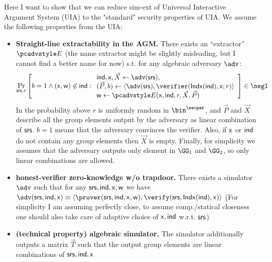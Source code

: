 \documentclass[runningheads,11pt]{llncs}
\let\spvec\vec \let\vec\accentvec
\let\vec\spvec
\begin{document}
Here I want to show that we can reduce sim-ext of Universal Interactive Argument System
(UIA) to the "standard" security properties of UIA.
We assume the following properties from the UIA:
\begin{itemize}
	\item {\bf Straight-line extractability in the AGM.}
		There exists an ``extractor'' $\Ext$ (the name extractor might be slightly misleading, but I
		cannot find a better name for now) s.t. for any algebraic adversary $\adv$:
		\[
			\Prob[\srs,r]{
					b=1 \wedge (\inp,\wit)\not\in\ind:
					\begin{array}{l}
					\ind,\inp, \vec X \gets\adv(\srs),\\
					(\vec P,b) \gets \braket{\adv(\srs),\verifier(\Iphp(\ind),\inp;r)}\\
					\wit \gets \Ext(\inp,\ind,r,\vec X,\vec P)
					\end{array}
					}\in\negl
		\]
		In the probability above $r$ is uniformly random in $\bin^\secpar$, and $\vec P$ and
		$\vec X$	describe all the group elements output by the adversary as linear combination of
		$\mathsf{srs}$. $b=1$ means that the adversary convinces the verifier. Also, if $\mathsf{x}$ or ${\mathsf{ind}}$
		do not contain any group elements then $\vec X$ is	empty. Finally, for simplicity we assumes that the adversary outputs only element in
		$\GG_1$ and $\GG_2$, so only linear combinations are allowed.
	\item {\bf honest-verifier zero-knowledge w/o trapdoor.}
		There exists a simulator $\sdv$ such that for any $\mathsf{srs},{\mathsf{ind}},\mathsf{x},\mathsf{w}$ we have
		$\sdv(\srs,\ind,\inp)\equiv
		\braket{\prover(\srs,\ind,\inp,\wit),\verify(\srs,\Iphp(\ind),\inp)}$
		(For simplicity I am assuming perfectly close, to assume comp./statical closeness one should also
		take care of adaptive choice of $\mathsf{x},{\mathsf{ind}}$ w.r.t. $\mathsf{srs}$)

	\item {\bf (technical property) algebraic simulator.}
		The simulator additionally outputs a matrix $\vec T$ such that the output group elements
		are linear combinations of $\mathsf{srs},{\mathsf{ind}},\mathsf{x}$

\end{itemize}
\end{document}
